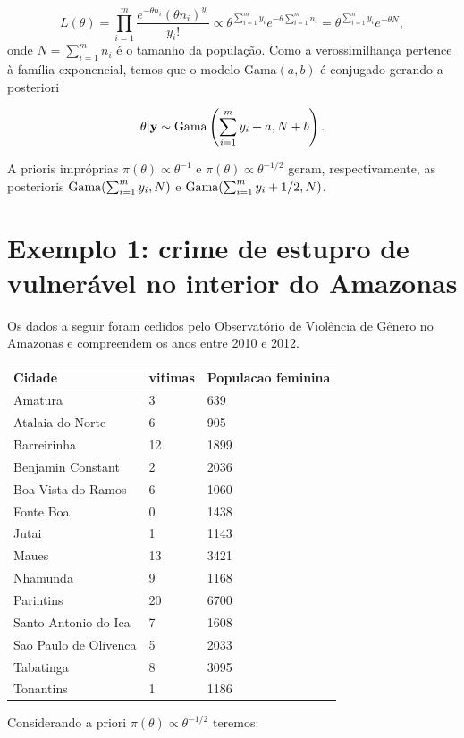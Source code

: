 \documentclass[
  letterpaper,
  DIV=11,
  numbers=noendperiod]{scrreprt}
\theoremstyle{plain}
\theoremstyle{definition}
\theoremstyle{definition}
\theoremstyle{remark}
\begin{document}
\[L(\theta)=\prod_{i=1}^m\frac{e^{-\theta n_i}(\theta n_i)^{y_i}}{y_i!}\varpropto \theta^{\sum_{i=1}^m y_i}e^{-\theta \sum_{i=1}^m n_i}=\theta^{\sum_{i=1}^n y_i}e^{-\theta N},\]
onde \(N=\sum_{i=1}^m n_i\) é o tamanho da população. Como a
verossimilhança pertence à família exponencial, temos que o modelo
Gama\((a,b)\) é conjugado gerando a posteriori

\[\theta|\mathbf{y}\sim\hbox{Gama}\left(\sum_{i=1}^{m}y_i+a,N+b\right).\]

A prioris impróprias \(\pi(\theta)\varpropto \theta^{-1}\) e
\(\pi(\theta)\varpropto \theta^{-1/2}\) geram, respectivamente, as
posterioris \(\hbox{Gama}(\sum_{i=1}^m y_i,N)\) e
\(\hbox{Gama}(\sum_{i=1}^m y_i+1/2,N)\).

\section{Exemplo 1: crime de estupro de vulnerável no interior do
Amazonas}\label{exemplo-1-crime-de-estupro-de-vulneruxe1vel-no-interior-do-amazonas}

Os dados a seguir foram cedidos pelo Observatório de Violência de Gênero
no Amazonas e compreendem os anos entre 2010 e 2012.

\begin{longtable}[]{@{}lll@{}}
\toprule\noalign{}
Cidade & vitimas & Populacao feminina \\
\midrule\noalign{}
\endhead
\bottomrule\noalign{}
\endlastfoot
Amatura & 3 & 639 \\
Atalaia do Norte & 6 & 905 \\
Barreirinha & 12 & 1899 \\
Benjamin Constant & 2 & 2036 \\
Boa Vista do Ramos & 6 & 1060 \\
Fonte Boa & 0 & 1438 \\
Jutai & 1 & 1143 \\
Maues & 13 & 3421 \\
Nhamunda & 9 & 1168 \\
Parintins & 20 & 6700 \\
Santo Antonio do Ica & 7 & 1608 \\
Sao Paulo de Olivenca & 5 & 2033 \\
Tabatinga & 8 & 3095 \\
Tonantins & 1 & 1186 \\
\end{longtable}

Considerando a priori \(\pi(\theta)\varpropto \theta^{-1/2}\) teremos:
\end{document}
